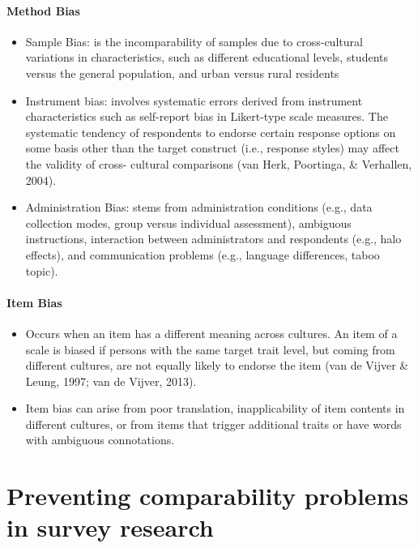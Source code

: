 \documentclass[
]{book}
\begin{document}
\hypertarget{method-bias}{%
\subsubsection{Method Bias}\label{method-bias}}

\begin{itemize}
\item
  Sample Bias: is the incomparability of samples due to cross-cultural variations in characteristics, such as different educational levels, students versus the general population, and urban versus rural residents
\item
  Instrument bias: involves systematic errors derived from instrument characteristics such as self-report bias in Likert-type scale measures. The systematic tendency of respondents to endorse certain response options on some basis other than the target construct (i.e., response styles) may affect the validity of cross- cultural comparisons (van Herk, Poortinga, \& Verhallen, 2004).
\item
  Administration Bias: stems from administration conditions (e.g., data collection modes, group versus individual assessment), ambiguous instructions, interaction between administrators and respondents (e.g., halo effects), and communication problems (e.g., language differences, taboo topic).
\end{itemize}

\hypertarget{item-bias}{%
\subsubsection{Item Bias}\label{item-bias}}

\begin{itemize}
\item
  Occurs when an item has a different meaning across cultures. An item of a scale is biased if persons with the same target trait level, but coming from different cultures, are not equally likely to endorse the item (van de Vijver \& Leung, 1997; van de Vijver, 2013).
\item
  Item bias can arise from poor translation, inapplicability of item contents in different cultures, or from items that trigger additional traits or have words with ambiguous connotations.
\end{itemize}

\hypertarget{preventing-comparability-problems-in-survey-research}{%
\chapter{Preventing comparability problems in survey research}\label{preventing-comparability-problems-in-survey-research}}
\end{document}
